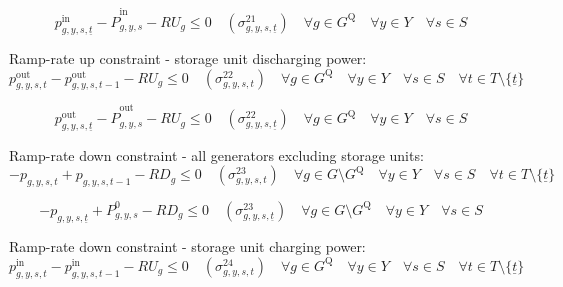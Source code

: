 \documentclass{article}
\newcommand{\sGenerators}{G}
\newcommand{\sStorage}{G^{\mathrm{Q}}}
\newcommand{\sYears}{Y}
\newcommand{\sScenarios}{S}
\newcommand{\sIntervals}{T}
\newcommand{\iGenerator}{g}
\newcommand{\iYear}{y}
\newcommand{\iScenario}{s}
\newcommand{\iInterval}{t}
\newcommand{\iIntervalStart}{\underline{\iInterval}}
\newcommand{\cRampRateUp}[1][\iGenerator]{RU_{#1}}
\newcommand{\cRampRateDown}[1][\iGenerator]{RD_{#1}}
\newcommand{\cPowerInitial}[1][\iGenerator,\iYear,\iScenario]{P_{#1}^{0}}
\newcommand{\cPowerOutInitial}[1][\iGenerator,\iYear,\iScenario]{\hat{P}_{#1}^{\mathrm{out}}}
\newcommand{\cPowerInInitial}[1][\iGenerator,\iYear,\iScenario]{\hat{P}_{#1}^{\mathrm{in}}}
\newcommand{\vPower}[1][\iGenerator,\iYear,\iScenario,\iInterval]{p_{#1}}
\newcommand{\vPowerIn}[1][\iGenerator,\iYear,\iScenario,\iInterval]{p^{\mathrm{in}}_{#1}}
\newcommand{\vPowerOut}[1][\iGenerator,\iYear,\iScenario,\iInterval]{p^{\mathrm{out}}_{#1}}
\newcommand{\dRampRateUpStorageCharging}[1][\iGenerator,\iYear,\iScenario,\iInterval]{\sigma_{#1}^{21}}
\newcommand{\dRampRateUpStorageDischarging}[1][\iGenerator,\iYear,\iScenario,\iInterval]{\sigma_{#1}^{22}}
\newcommand{\dRampRateDown}[1][\iGenerator,\iYear,\iScenario,\iInterval]{\sigma_{#1}^{23}}
\newcommand{\dRampRateDownStorageCharging}[1][\iGenerator,\iYear,\iScenario,\iInterval]{\sigma_{#1}^{24}}
\begin{document}
\begin{equation}
\vPowerIn[\iGenerator,\iYear,\iScenario,\iIntervalStart] - \cPowerInInitial - \cRampRateUp \leq 0 \quad (\dRampRateUpStorageCharging[\iGenerator,\iYear,\iScenario,\iIntervalStart]) \quad \forall \iGenerator \in \sStorage \quad \forall \iYear \in \sYears \quad \forall \iScenario \in \sScenarios
\end{equation}

Ramp-rate up constraint - storage unit discharging power:
\begin{equation}
\vPowerOut - \vPowerOut[\iGenerator,\iYear,\iScenario,\iInterval-1] - \cRampRateUp \leq 0 \quad (\dRampRateUpStorageDischarging) \quad \forall \iGenerator \in \sStorage \quad \forall \iYear \in \sYears \quad \forall \iScenario \in \sScenarios \quad \forall \iInterval \in \sIntervals \setminus \{\iIntervalStart\}
\end{equation}

\begin{equation}
\vPowerOut[\iGenerator,\iYear,\iScenario,\iIntervalStart] - \cPowerOutInitial - \cRampRateUp \leq 0 \quad (\dRampRateUpStorageDischarging[\iGenerator,\iYear,\iScenario,\iIntervalStart]) \quad \forall \iGenerator \in \sStorage \quad \forall \iYear \in \sYears \quad \forall \iScenario \in \sScenarios
\end{equation}

Ramp-rate down constraint - all generators excluding storage units:
\begin{equation}
	- \vPower + \vPower[\iGenerator,\iYear,\iScenario,\iInterval-1] - \cRampRateDown \leq 0 \quad (\dRampRateDown) \quad \forall \iGenerator \in \sGenerators \setminus \sStorage \quad \forall \iYear \in \sYears \quad \forall \iScenario \in \sScenarios \quad \forall \iInterval \in \sIntervals \setminus \{\iIntervalStart\}
\end{equation}

\begin{equation}
- \vPower[\iGenerator,\iYear,\iScenario,\iIntervalStart] + \cPowerInitial - \cRampRateDown \leq 0 \quad (\dRampRateDown[\iGenerator,\iYear,\iScenario,\iIntervalStart]) \quad \forall \iGenerator \in \sGenerators\setminus \sStorage \quad \forall \iYear \in \sYears \quad \forall \iScenario \in \sScenarios
\end{equation}

Ramp-rate down constraint - storage unit charging power:
\begin{equation}
\vPowerIn - \vPowerIn[\iGenerator,\iYear,\iScenario,\iInterval-1] - \cRampRateUp \leq 0 \quad (\dRampRateDownStorageCharging) \quad \forall \iGenerator \in \sStorage \quad \forall \iYear \in \sYears \quad \forall \iScenario \in \sScenarios \quad \forall \iInterval \in \sIntervals \setminus \{\iIntervalStart\}
\end{equation}
\end{document}

